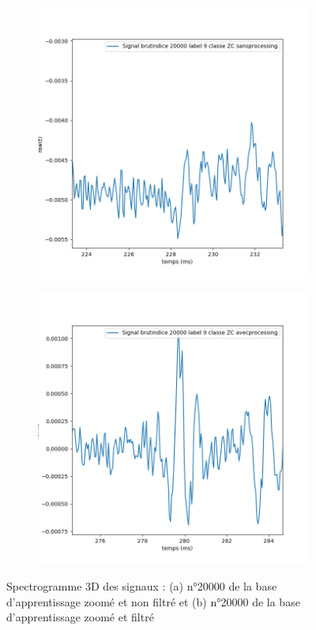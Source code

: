 \begin{figure}[!h]
\centering
  \begin{subfigure}[b]{0.45\textwidth}
    \includegraphics[width=\textwidth]{./images/indice20000Spectro1Dlabel9classeZCsansprocessingaveczoom.png}
  \end{subfigure}
  \begin{subfigure}[b]{0.45\textwidth}
    \includegraphics[width=\textwidth]{./images/indice20000Spectro1Dlabel9classeZCavecprocessingaveczoom.png}
  \end{subfigure}
  \caption{Spectrogramme 3D des signaux : (a) n°20000 de la base d'apprentissage zoomé et non filtré et (b) n°20000 de la base d'apprentissage zoomé et filtré%
\label{fig:20000zoomavecetsansfiltrage}}
\end{figure}

